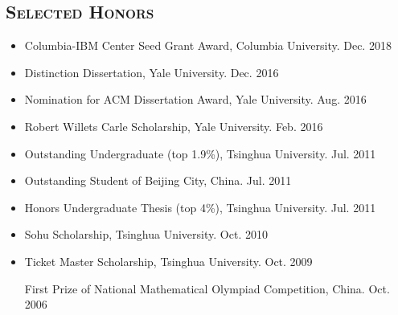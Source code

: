 \documentclass[10pt]{article}
\renewcommand{\section}[1]{
	\vspace{-5pt}
   	\subsection*{\scshape  \bfseries #1}
   }
\newenvironment{innerlist}[1][\enskip\textbullet]%
        {\begin{itemize}[#1,leftmargin=25pt,parsep=0pt,itemsep=2pt,topsep=2pt,partopsep=0pt]}
        {\end{itemize}}
\begin{document}
\section{Selected Honors}
\begin{innerlist}
\item[] Columbia-IBM Center Seed Grant Award, Columbia University. \hfill{Dec. 2018}%
\vspace{0.05in}

\item[] Distinction Dissertation, Yale University. \hfill{Dec. 2016}

\vspace{0.05in}

\item[] Nomination for ACM Dissertation Award, Yale University. \hfill{Aug. 2016}

\vspace{0.05in}

\item[] Robert Willets Carle Scholarship, Yale University. \hfill Feb. 2016

\vspace{0.05in}

\item[] Outstanding Undergraduate (top 1.9\%), Tsinghua University. \hfill Jul. 2011

\vspace{0.05in}

\item[] Outstanding Student of Beijing City, China. \hfill Jul. 2011

\vspace{0.05in}

\item[] Honors Undergraduate Thesis (top 4\%), Tsinghua University. \hfill{Jul. 2011}

\vspace{0.05in}

\item[] Sohu Scholarship,  Tsinghua University. \hfill Oct. 2010

\vspace{0.05in}

\item[] Ticket Master Scholarship,  Tsinghua University. \hfill Oct. 2009

\vspace{0.05in}

First Prize of National Mathematical Olympiad Competition, China.
\hfill Oct. 2006
\end{innerlist}
\end{document}
